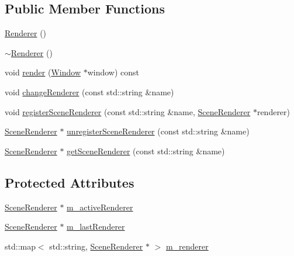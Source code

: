 \subsection*{Public Member Functions}
\begin{DoxyCompactItemize}
\item 
\mbox{\hyperlink{classec_1_1_renderer_a1bb0d9ff47eabce408daff8ab55bf4dc}{Renderer}} ()
\item 
\mbox{\hyperlink{classec_1_1_renderer_ab0a97bd174127b670899477a576d1fe6}{$\sim$\+Renderer}} ()
\item 
void \mbox{\hyperlink{classec_1_1_renderer_aecc57f271196b00c4ec3cae7ad5317ae}{render}} (\mbox{\hyperlink{classec_1_1_window}{Window}} $\ast$window) const
\item 
void \mbox{\hyperlink{classec_1_1_renderer_abb876cb59df2478b52926782e2d0a0a9}{change\+Renderer}} (const std\+::string \&name)
\item 
void \mbox{\hyperlink{classec_1_1_renderer_a5e40791070a8fcb7250b4544bdac8725}{register\+Scene\+Renderer}} (const std\+::string \&name, \mbox{\hyperlink{classec_1_1_scene_renderer}{Scene\+Renderer}} $\ast$renderer)
\item 
\mbox{\hyperlink{classec_1_1_scene_renderer}{Scene\+Renderer}} $\ast$ \mbox{\hyperlink{classec_1_1_renderer_a5c853ee4c34b069cc8142db8409abac6}{unregister\+Scene\+Renderer}} (const std\+::string \&name)
\item 
\mbox{\hyperlink{classec_1_1_scene_renderer}{Scene\+Renderer}} $\ast$ \mbox{\hyperlink{classec_1_1_renderer_ab4e0c57f9d1f061f97e1fa188d52c477}{get\+Scene\+Renderer}} (const std\+::string \&name)
\end{DoxyCompactItemize}
\subsection*{Protected Attributes}
\begin{DoxyCompactItemize}
\item 
\mbox{\hyperlink{classec_1_1_scene_renderer}{Scene\+Renderer}} $\ast$ \mbox{\hyperlink{classec_1_1_renderer_a00afed952025d62a654a5f961a55b342}{m\+\_\+active\+Renderer}}
\item 
\mbox{\hyperlink{classec_1_1_scene_renderer}{Scene\+Renderer}} $\ast$ \mbox{\hyperlink{classec_1_1_renderer_a818d84064fde8088d28358f7ea04f898}{m\+\_\+last\+Renderer}}
\item 
std\+::map$<$ std\+::string, \mbox{\hyperlink{classec_1_1_scene_renderer}{Scene\+Renderer}} $\ast$ $>$ \mbox{\hyperlink{classec_1_1_renderer_ac3f0c1c3253fbac0f734af313cc410a4}{m\+\_\+renderer}}
\end{DoxyCompactItemize}


